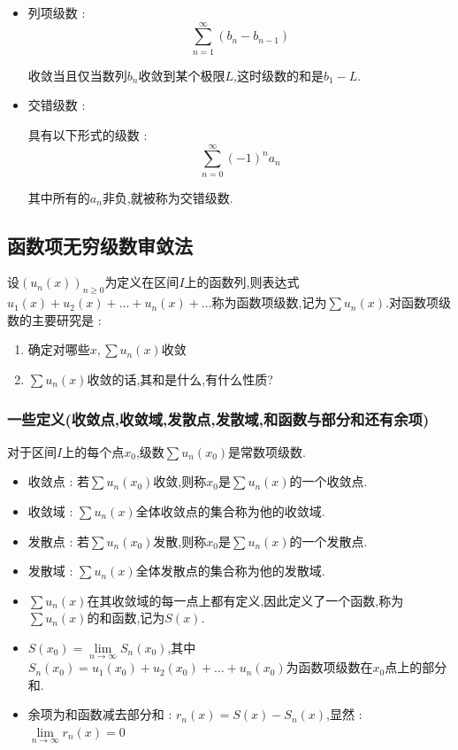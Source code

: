 \documentclass[UTF8,12pt]{ctexbook}
\newcommand{\limNormal}[1]{\lim\limits_{#1}}
\newcommand{\upDownSum}[2]{\sum\limits_{#2}^{#1}}
\newcommand{\sumSeries}{\upDownSum{\infty}{n = 1}}
\begin{document}
{{{{{\begin{itemize}
{            指通项为$\cfrac{1}{n^p}$的级数 :
            $$
              U_p = \sumSeries\cfrac{1}{n^p}
            $$

            对于实数值$p$,当$p > 1$时收敛,$p <= 1$时发散,$p = 1$时为调和级数.
            }
      \item{
            列项级数 :
            $$
              \sumSeries(b_n - b_{n - 1})
            $$

            收敛当且仅当数列$b_n$收敛到某个极限$L$,这时级数的和是$b_1 - L$.
            }
      \item{
            交错级数 :

            具有以下形式的级数 :
            $$
              \upDownSum{\infty}{n = 0}(-1)^na_n
            $$

            其中所有的$a_n$非负,就被称为交错级数.
            }
    \end{itemize}

  }%

}%

\subsection{函数项无穷级数审敛法}{
设$(u_n(x))_{n \geq 0}$为定义在区间$I$上的函数列,则表达式$u_1(x) + u_2(x) + \dots + u_n(x) + \dots$称为函数项级数,记为$\sum u_n(x)$.对函数项级数的主要研究是 :
\begin{enumerate}
  \item 确定对哪些$x,\sum u_n(x)$收敛
  \item $\sum u_n(x)$收敛的话,其和是什么,有什么性质?
\end{enumerate}

\subsubsection{一些定义(收敛点,收敛域,发散点,发散域,和函数与部分和还有余项)}{
  对于区间$I$上的每个点$x_0$,级数$\sum u_n(x_0)$是常数项级数.
  \begin{itemize}
    \item 收敛点 : 若$\sum u_n(x_0)$收敛,则称$x_0$是$\sum u_n(x)$的一个收敛点.
    \item 收敛域 : $\sum u_n(x)$全体收敛点的集合称为他的收敛域.
    \item 发散点 : 若$\sum u_n(x_0)$发散,则称$x_0$是$\sum u_n(x)$的一个发散点.
    \item 发散域 : $\sum u_n(x)$全体发散点的集合称为他的发散域.
    \item $\sum u_n(x)$在其收敛域的每一点上都有定义,因此定义了一个函数,称为$\sum u_n(x)$的和函数,记为$S(x)$.
    \item $S(x_0) = \limNormal{n \to \infty}S_n(x_0)$,其中$S_n(x_0) = u_1(x_0) + u_2(x_0) + \dots + u_n(x_0)$为函数项级数在$x_0$点上的部分和.
    \item 余项为和函数减去部分和 : $r_n(x) = S(x) - S_n(x)$,显然 : $\limNormal{n \to \infty} r_n(x) = 0$
  \end{itemize}
}%

}}}}
\end{document}
